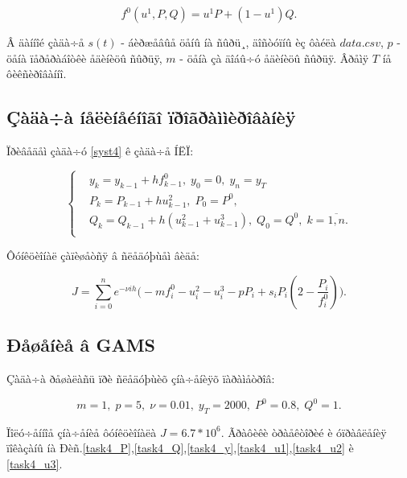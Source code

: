 \documentclass[14pt]{article}
\begin{document}
$$
    f^0(u^1,P,Q) = u^1 P + (1 -u^1) Q.
$$

Â äàííîé çàäà÷å $s(t)$ - áèðæåâûå öåíû íà ñûðü¸, äîñòóïíû èç ôàéëà $data.csv$, $p$ - öåíà ïåðåðàáîòêè åäèíèöû ñûðüÿ, $m$ - öåíà çà äîáû÷ó åäèíèöû ñûðüÿ. Âðåìÿ $T$ íå ôèêñèðîâàííî.

\subsection{Çàäà÷à íåëèíåéíîãî ïðîãðàììèðîâàíèÿ}

Ïðèâåäåì çàäà÷ó \eqref{syst4} ê çàäà÷å ÍËÏ:

\begin{equation}\label{NLP4}
\left\{ \begin{aligned}
& y_{k} = y_{k-1} + h f^0_{k-1}, \; y_0 = 0,\; y_n = y_T \\
& P_{k} = P_{k-1} + h u^2_{k-1}, \; P_0 = P^0, \\
& Q_{k} = Q_{k-1} + h (u^2_{k-1} + u^3_{k-1}), \; Q_0 = Q^0, \; k = \overline{1,n}. \\
\end{aligned}\right.
\end{equation}

Ôóíêöèîíàë çàïèøåòñÿ â ñëåäóþùåì âèäå:

$$
    J = \sum_{i=0}^n e^{-\nu ih}\Big( -m f^0_i - u^2_i - u^3_i -p P_i + s_i P_i (2-\frac{P_i}{f^0_i}) \Big).
$$


\subsection{Ðåøåíèå â GAMS}

Çàäà÷à ðåøàëàñü ïðè ñëåäóþùèõ çíà÷åíèÿõ ïàðàìåòðîâ:

$$
    m = 1,\;p=5,\;\nu=0.01,\;y_T=2000,\;P^0=0.8,\;Q^0=1.
$$

Ïîëó÷åííîå çíà÷åíèå ôóíêöèîíàëà $J = 6.7*10^6$. Ãðàôèêè òðàåêòîðèé è óïðàâëåíèÿ ïîêàçàíû íà Ðèñ.\ref{task4_P},\ref{task4_Q},\ref{task4_y},\ref{task4_u1},\ref{task4_u2} è \ref{task4_u3}.
\end{document}
